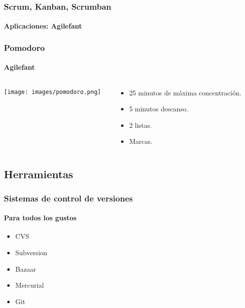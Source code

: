   \begin{frame}
   \frametitle{Scrum, Kanban, Scrumban}
   \framesubtitle{Aplicaciones: Agilefant}
   \begin{center}
   \end{center}

  \end{frame}

  \begin{frame}
   \frametitle{Pomodoro}
   \framesubtitle{Agilefant}

   \begin{columns}
    \begin{column}{4cm}
     \texttt{[image: images/pomodoro.png]}
    \end{column}
    \begin{column}{7cm}
     \begin{itemize}
      \item<1-> 25 minutos de máxima concentración.
      \item<2-> 5 minutos descanso.
      \item<3-> 2 listas.
      \item<4-> Marcas.
     \end{itemize}
    \end{column}
   \end{columns}
  \end{frame}


  \subsection{Herramientas}

  \begin{frame}
   \frametitle{Sistemas de control de versiones}
   \framesubtitle{Para todos los gustos}

   \begin{itemize}
    \item CVS
    \item Subversion
    \item Bazaar
    \item Mercurial
    \item Git
   \end{itemize}
  \end{frame}

